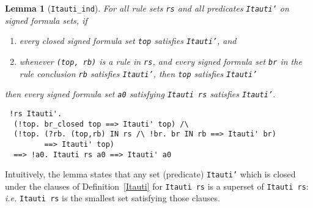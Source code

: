 \documentclass[a4paper]{article}
\newtheorem{lemma}{Lemma}
\newtheorem{definition}{Definition}
\newcommand{\hol}{\texttt{HOL4}}
\newcommand{\ie}{\textit{i.e. }}
\begin{document}
\begin{lemma}[\texttt{Itauti\_ind}]\label{Itauti-ind}
For all rule sets \texttt{rs}
and all predicates \texttt{Itauti'} on signed formula sets, if
\begin{enumerate}
\item every closed signed formula set \texttt{top} satisfies
  \texttt{Itauti'}, and
\item whenever \texttt{(top, rb)} is a rule in \texttt{rs}, and every
  signed formula set \texttt{br} in the rule conclusion \texttt{rb} satisfies
  \texttt{Itauti'}, then \texttt{top} satisfies \texttt{Itauti'}
\end{enumerate}
then every signed formula set 
\texttt{a0} satisfying \texttt{Itauti rs} satisfies
\texttt{Itauti'}.
\end{lemma}
\begin{verbatim}
 !rs Itauti'. 
  (!top. br_closed top ==> Itauti' top) /\ 
  (!top. (?rb. (top,rb) IN rs /\ !br. br IN rb ==> Itauti' br) 
         ==> Itauti' top) 
  ==> !a0. Itauti rs a0 ==> Itauti' a0
\end{verbatim}

Intuitively, the lemma states that
any set (predicate) \texttt{Itauti'} which is closed under
the clauses of Definition~\ref{Itauti} for \texttt{Itauti rs} is a superset
of \texttt{Itauti rs}: \ie \texttt{Itauti rs} is the smallest set
satisfying those clauses.

\end{document}
